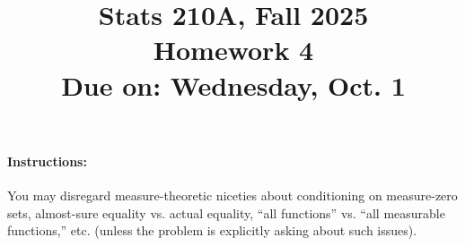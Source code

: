 \documentclass{article}
\theoremstyle{definition}
\begin{document}
\title{Stats 210A, Fall 2025\\
  Homework 4 \\
  {\large {\bf Due on}: Wednesday, Oct. 1}}
\date{}

\maketitle

\paragraph{Instructions:} You may disregard measure-theoretic niceties about conditioning on measure-zero sets, almost-sure equality vs. actual equality, ``all functions'' vs. ``all measurable functions,'' etc. (unless the problem is explicitly asking about such issues).
\end{document}
